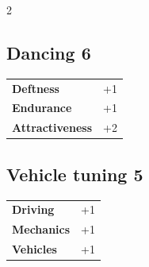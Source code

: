 \begin{multicols}{2}
\begin{tcolorbox}

\end{tcolorbox}

\begin{tcolorbox}
    \subsection*{Dancing \hfill \small{6 }}
    \tcblower




\begin{tabular}{@{}ll@{}}
    \textbf{Deftness} & +1\\
    \textbf{Endurance} & +1\\
    \textbf{Attractiveness} & +2\\
\end{tabular}


\end{tcolorbox}

\begin{tcolorbox}
    \subsection*{Vehicle tuning \hfill \small{5 }}
    \tcblower




\begin{tabular}{@{}ll@{}}
    \textbf{Driving} & +1\\
    \textbf{Mechanics} & +1\\
    \textbf{Vehicles} & +1\\
\end{tabular}



\end{tcolorbox}
\end{multicols}
